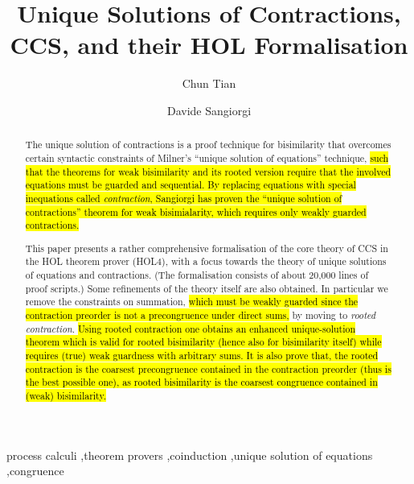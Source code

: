 \documentclass[3p]{elsarticle}
\begin{document}
\begin{frontmatter}

\title{Unique Solutions of Contractions, CCS, and their HOL
  Formalisation}

\author[mymainaddress]{Chun Tian}%
\address[mymainaddress]{Universit\`a di Trento and Fondazione Bruno
  Kessler, Italy}

\author[mysecondaryaddress]{Davide Sangiorgi}
\address[mysecondaryaddress]{Universit\`a di Bologna and INRIA, Italy}

\begin{abstract}
  The unique solution of contractions is a proof technique for
  bisimilarity that overcomes certain syntactic constraints of
  Milner's ``unique solution of equations'' technique, \hl{such that the
  theorems for weak bisimilarity and its rooted version require that
  the involved equations must be guarded and sequential. By replacing
  equations with special inequations called \emph{contraction}, Sangiorgi
  has proven the ``unique solution of contractions'' theorem for weak
  bisimialarity, which requires only weakly guarded contractions.}

  This paper presents a rather comprehensive formalisation of the
  core theory of CCS in the HOL theorem prover (HOL4), with a
  focus towards the theory of unique solutions of equations and contractions.  (The
  formalisation consists of about 20,000 lines of proof scripts.)
  Some refinements of the theory itself are also obtained.
  In particular we remove the constraints on summation,
  \hl{which must be weakly guarded since the contraction
  preorder is not a precongruence under direct sums,} by moving to \emph{rooted
  contraction}. \hl{Using rooted contraction one obtains an enhanced
  unique-solution theorem which is valid for rooted bisimilarity
  (hence also for bisimilarity itself) while requires (true) weak
  guardness with arbitrary sums.
  It is also prove that, the rooted contraction is the coarsest
  precongruence contained in the contraction preorder (thus is the best possible one),
  as rooted bisimilarity is the coarsest congruence contained
  in (weak) bisimilarity.}
\end{abstract}

\begin{keyword}
process calculi \sep theorem provers \sep coinduction \sep unique
solution of equations \sep congruence
\end{keyword}

\end{frontmatter}
\end{document}
